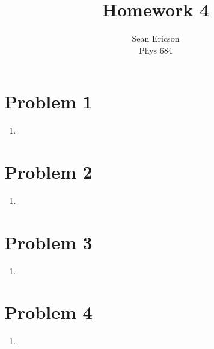 \documentclass[12pt]{article}
\begin{document}
	
\title{Homework 4}
\author{Sean Ericson \\ Phys 684}
\maketitle

\section*{Problem 1}
\begin{enumerate}[label=(\alph*)]
    \item 
\end{enumerate}

\section*{Problem 2}
\begin{enumerate}[label=(\alph*)]
    \item 
\end{enumerate}

\section*{Problem 3}
\begin{enumerate}[label=(\alph*)]
    \item 
\end{enumerate}

\section*{Problem 4}
\begin{enumerate}[label=(\alph*)]
    \item 
\end{enumerate}
\end{document}

